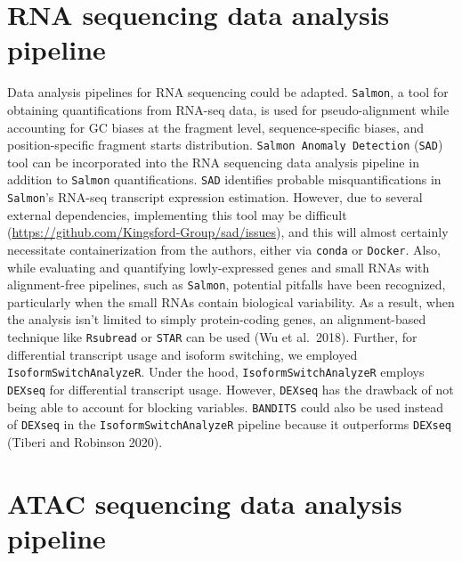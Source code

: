 \documentclass[12pt,twoside]{reedthesis}
\begin{document}
\hypertarget{rna-sequencing-data-analysis-pipeline}{%
\section*{RNA sequencing data analysis pipeline}\label{rna-sequencing-data-analysis-pipeline}}

Data analysis pipelines for RNA sequencing could be adapted. \texttt{Salmon}, a tool for obtaining quantifications from RNA-seq data, is used for pseudo-alignment while accounting for GC biases at the fragment level, sequence-specific biases, and position-specific fragment starts distribution. \texttt{Salmon\ Anomaly\ Detection} (\texttt{SAD}) tool can be incorporated into the RNA sequencing data analysis pipeline in addition to \texttt{Salmon} quantifications. \texttt{SAD} identifies probable misquantifications in \texttt{Salmon}'s RNA-seq transcript expression estimation. However, due to several external dependencies, implementing this tool may be difficult (\url{https://github.com/Kingsford-Group/sad/issues}), and this will almost certainly necessitate containerization from the authors, either via \texttt{conda} or \texttt{Docker}. Also, while evaluating and quantifying lowly-expressed genes and small RNAs with alignment-free pipelines, such as \texttt{Salmon}, potential pitfalls have been recognized, particularly when the small RNAs contain biological variability. As a result, when the analysis isn't limited to simply protein-coding genes, an alignment-based technique like \texttt{Rsubread} or \texttt{STAR} can be used (Wu et al.~2018). Further, for differential transcript usage and isoform switching, we employed \texttt{IsoformSwitchAnalyzeR}. Under the hood, \texttt{IsoformSwitchAnalyzeR} employs \texttt{DEXseq} for differential transcript usage. However, \texttt{DEXseq} has the drawback of not being able to account for blocking variables. \texttt{BANDITS} could also be used instead of \texttt{DEXseq} in the \texttt{IsoformSwitchAnalyzeR} pipeline because it outperforms \texttt{DEXseq} (Tiberi and Robinson 2020).

\hypertarget{atac-sequencing-data-analysis-pipeline}{%
\section*{ATAC sequencing data analysis pipeline}\label{atac-sequencing-data-analysis-pipeline}}
\end{document}
